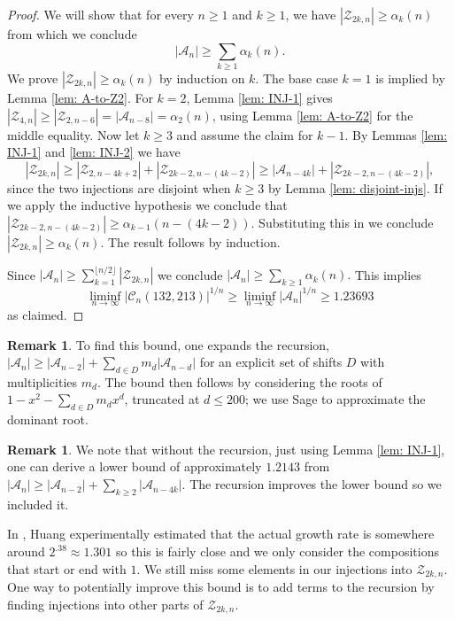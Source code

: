 \documentclass[11pt]{article}
\newcommand\A{\mathcal A}
\newcommand\cZ{\mathcal Z}
\newcommand\C{\mathcal C}
\theoremstyle{definition}
\newtheorem{remark}[theorem]{Remark}
\begin{document}
\begin{proof}
    We will show that for every $n \ge 1$ and $k \ge 1$, we have $|\cZ_{2k,n}| \ge \alpha_k(n)$ from which we conclude
    \[
    |\A_n| \ge \sum_{k \ge 1} \alpha_k(n).
    \]
    We prove $|\cZ_{2k,n}| \ge \alpha_k(n)$ by induction on $k$. The base case $k=1$ is implied by Lemma \ref{lem: A-to-Z2}. For $k=2$, Lemma \ref{lem: INJ-1} gives $|\cZ_{4,n}| \ge |\cZ_{2,n-6}| = |\A_{n-8}| = \alpha_2(n)$, using Lemma \ref{lem: A-to-Z2} for the middle equality. Now let $k \ge 3$ and assume the claim for $k-1$. By Lemmas \ref{lem: INJ-1} and \ref{lem: INJ-2} we have
    \[
    |\cZ_{2k,n}| \ge |\cZ_{2,n-4k+2}| + |\cZ_{2k-2,n-(4k-2)}| \ge |\A_{n-4k}| + |\cZ_{2k-2,n-(4k-2)}|,
    \]
    since the two injections are disjoint when $k \ge 3$ by Lemma \ref{lem: disjoint-injs}. If we apply the inductive hypothesis we conclude that $|\cZ_{2k-2,n-(4k-2)}| \ge \alpha_{k-1}(n-(4k-2))$. Substituting this in we conclude $|\cZ_{2k,n}| \ge \alpha_k(n)$. The result follows by induction.

    Since $|\A_n| \ge \sum_{k=1}^{\lfloor n/2 \rfloor} |\cZ_{2k,n}|$ we conclude $|\A_n| \ge \sum_{k \ge 1} \alpha_k(n).$ This implies 
    \[
    \liminf_{n \to \infty} |\C_n(132,213)|^{1/n} \ge \liminf_{n \to \infty} |\A_n|^{1/n} \ge 1.23693
    \] 
    as claimed.
\end{proof}

\begin{remark}
    To find this bound, one expands the recursion, $|\A_n| \ge |\A_{n-2}| + \sum_{d \in D} m_d |\A_{n-d}|$ for an explicit set of shifts $D$ with multiplicities $m_d$. The bound then follows by considering the roots of $1 - x^2 - \sum_{d \in D} m_d x^d$, truncated at $d \le 200$; we use Sage \cite{Sage} to approximate the dominant root.
\end{remark}

\begin{remark} \label{remark: truncation}
   We note that without the recursion, just using Lemma \ref{lem: INJ-1}, one can derive a lower bound of approximately $1.2143$ from $|\A_n| \ge |\A_{n-2}| + \sum_{k \ge 2} |\A_{n-4k}|$. The recursion improves the lower bound so we included it.
\end{remark}

In \cite{H19}, Huang experimentally estimated that the actual growth rate is somewhere around $2^{.38}\approx 1.301$ so this is fairly close and we only consider the compositions that start or end with $1$. We still miss some elements in our injections into $\cZ_{2k,n}$. One way to potentially improve this bound is to add terms to the recursion by finding injections into other parts of $\cZ_{2k,n}$.
\end{document}

